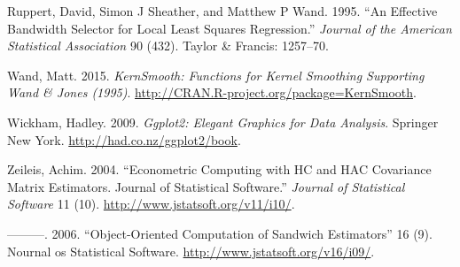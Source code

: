 \documentclass[article]{jss}
\begin{document}
Ruppert, David, Simon J Sheather, and Matthew P Wand. 1995. ``An
Effective Bandwidth Selector for Local Least Squares Regression.''
\emph{Journal of the American Statistical Association} 90 (432). Taylor
\& Francis: 1257--70.

Wand, Matt. 2015. \emph{KernSmooth: Functions for Kernel Smoothing
Supporting Wand \& Jones (1995)}.
\url{http://CRAN.R-project.org/package=KernSmooth}.

Wickham, Hadley. 2009. \emph{Ggplot2: Elegant Graphics for Data
Analysis}. Springer New York. \url{http://had.co.nz/ggplot2/book}.

Zeileis, Achim. 2004. ``Econometric Computing with HC and HAC Covariance
Matrix Estimators. Journal of Statistical Software.'' \emph{Journal of
Statistical Software} 11 (10). \url{http://www.jstatsoft.org/v11/i10/}.

---------. 2006. ``Object-Oriented Computation of Sandwich Estimators''
16 (9). Nournal os Statistical Software.
\url{http://www.jstatsoft.org/v16/i09/}.
\end{document}
